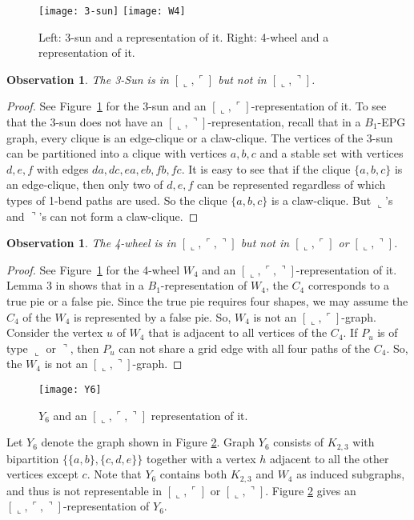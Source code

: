 \documentclass[11pt,3p,times]{elsarticle}
\newenvironment{myproof}{\begin{proof}}{\end{proof}}
\newcommand{\La}{\ensuremath{\llcorner}} \newcommand{\Lb}{\ensuremath{\ulcorner}} \newcommand{\Lc}{\ensuremath{\lrcorner}} \newcommand{\Ld}{\ensuremath{\urcorner}}
\newtheorem{observation}[theorem]{Observation}
\begin{document}
\begin{figure}[bth]
\hfill
\texttt{[image: 3-sun]}
\hfill
\texttt{[image: W4]}
 \hfill \ \caption{Left: 3-sun and a
representation of it. Right: 4-wheel and a
representation of it.}\label{fig:3-sun-and4-wheel}
\end{figure}
\begin{observation}\label{obs:3-sun}
The 3-Sun is in $[\La,\Lb]$ but not in $[\La,\Ld]$.
\end{observation}
\begin{myproof}
See Figure~\ref{fig:3-sun-and4-wheel} for the 3-sun and an
$[\La,\Lb]$-representation of it. To see that the 3-sun
does not have an $[\La,\Ld]$-representation, recall that in a
$B_1$-EPG graph, every clique is an edge-clique or a claw-clique.
The vertices of the 3-sun can be partitioned into a clique with
vertices $a,b,c$ and a stable set with vertices $d,e,f$ with edges
$da, dc, ea, eb, fb, fc$.  It is easy to see that if the clique
$\{a,b,c\}$ is an edge-clique, then only two of $d,e,f$ can be
represented regardless of which types of 1-bend paths are used. So
the clique $\{a,b,c\}$ is a claw-clique. But $\La$'s and $\Ld$'s
can not form a claw-clique.
\end{myproof}
\begin{observation}\label{obs:4-wheel}
The 4-wheel is in $[\La,\Lb,\Ld]$ but not in $[\La,\Lb]$ or
$[\La,\Ld]$.
\end{observation}
\begin{myproof}
See Figure~\ref{fig:3-sun-and4-wheel} for the 4-wheel $W_4$ and an
$[\La,\Lb, \Ld]$-representation of it. Lemma 3 in
\cite{Asi2012} shows that in a $B_1$-representation of $W_4$, the
$C_4$ corresponds to a true pie or a false pie. Since the true pie
requires four shapes, we may assume the $C_4$ of the $W_4$ is
represented by a false pie. So, $W_4$ is not an $[\La,\Lb]$-graph.
Consider the vertex $u$ of $W_4$ that is adjacent to all vertices
of the $C_4$. If $P_u$ is of type $\La$ or $\Ld$, then $P_u$ can
not share a grid edge with all four paths of the $C_4$. So, the
$W_4$ is not an $[\La,\Ld]$-graph.
\end{myproof}

\begin{figure}[bth]
\centering
\texttt{[image: Y6]}
\caption{$Y_6$ and an $[\La,\Lb,\Ld]$ representation of it.}
\label{fig:Y6}
\end{figure}


Let $Y_6$ denote the graph shown in Figure
\ref{fig:Y6}.
Graph $Y_6$ consists of $K_{2,3}$ with bipartition $\{\{a,b\},\{c,d,e\}\}$
together with a vertex $h$ adjacent to all the other vertices except $c$. Note
that $Y_6$ contains both $K_{2,3}$ and $W_4$ as induced subgraphs, and thus is
not representable in $[\La,\Lb]$ or $[\La,\Ld]$. Figure
\ref{fig:Y6}
gives an $[\La,\Lb, \Ld]$-representation of $Y_6$.
\end{document}
